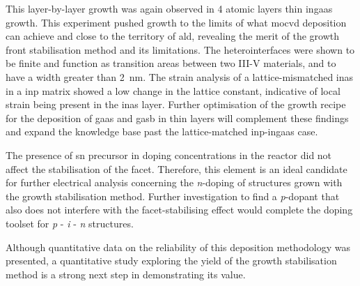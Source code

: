 This layer-by-layer growth was again observed in 4 atomic layers thin \acs{ingaas} growth. This experiment pushed growth to the limits of what \acs{mocvd} deposition can achieve and close to the territory of \acs{ald}, revealing the merit of the growth front stabilisation method and its limitations. The heterointerfaces were shown to be finite and function as transition areas between two III-V materials, and to have a width greater than \qty{2}{\nano\metre}. The strain analysis of a lattice-mismatched \acs{inas} in a \acs{inp} matrix showed a low change in the lattice constant, indicative of local strain being present in the \acs{inas} layer. Further optimisation of the growth recipe for the deposition of \acs{gaas} and \acs{gasb} in thin layers will complement these findings and expand the knowledge base past the lattice-matched \acs{inp}-\acs{ingaas} case.

The presence of \acl{sn} precursor in doping concentrations in the reactor did not affect the stabilisation of the  facet. Therefore, this element is an ideal candidate for further electrical analysis concerning the \textit{n}-doping of structures grown with the growth stabilisation method. Further investigation to find a \textit{p}-dopant that also does not interfere with the facet-stabilising effect would complete the doping toolset for \textit{p} - \textit{i} - \textit{n} structures.

Although quantitative data on the reliability of this deposition methodology was presented, a quantitative study exploring the yield of the growth stabilisation method is a strong next step in demonstrating its value. 